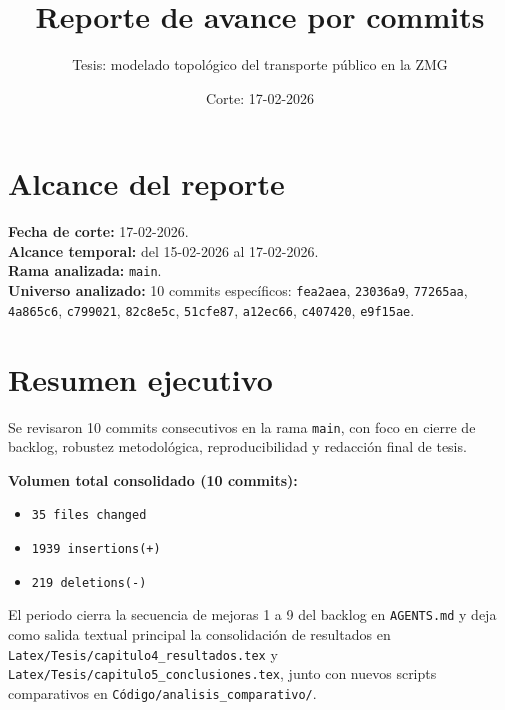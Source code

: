 \documentclass[11pt]{article}
\title{\textbf{Reporte de avance por commits}}
\author{Tesis: modelado topol\'ogico del transporte p\'ublico en la ZMG}
\date{Corte: 17-02-2026}
\begin{document}
\maketitle

\section{Alcance del reporte}
\textbf{Fecha de corte:} 17-02-2026.\\
\textbf{Alcance temporal:} del 15-02-2026 al 17-02-2026.\\
\textbf{Rama analizada:} \texttt{main}.\\
\textbf{Universo analizado:} 10 commits espec\'ificos:
\texttt{fea2aea}, \texttt{23036a9}, \texttt{77265aa}, \texttt{4a865c6}, \texttt{c799021}, \texttt{82c8e5c}, \texttt{51cfe87}, \texttt{a12ec66}, \texttt{c407420}, \texttt{e9f15ae}.

\section{Resumen ejecutivo}
Se revisaron 10 commits consecutivos en la rama \texttt{main}, con foco en cierre de backlog, robustez metodol\'ogica, reproducibilidad y redacci\'on final de tesis.

\textbf{Volumen total consolidado (10 commits):}
\begin{itemize}
  \item \texttt{35 files changed}
  \item \texttt{1939 insertions(+)}
  \item \texttt{219 deletions(-)}
\end{itemize}

El periodo cierra la secuencia de mejoras 1 a 9 del backlog en \texttt{AGENTS.md} y deja como salida textual principal la consolidaci\'on de resultados en \texttt{Latex/Tesis/capitulo4\_resultados.tex} y \texttt{Latex/Tesis/capitulo5\_conclusiones.tex}, junto con nuevos scripts comparativos en \texttt{C\'odigo/analisis\_comparativo/}.
\end{document}
